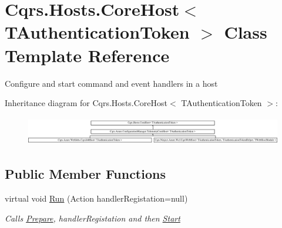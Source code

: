 \hypertarget{classCqrs_1_1Hosts_1_1CoreHost}{}\section{Cqrs.\+Hosts.\+Core\+Host$<$ T\+Authentication\+Token $>$ Class Template Reference}
\label{classCqrs_1_1Hosts_1_1CoreHost}


Configure and start command and event handlers in a host  


Inheritance diagram for Cqrs.\+Hosts.\+Core\+Host$<$ T\+Authentication\+Token $>$\+:\begin{figure}[H]
\begin{center}
\leavevmode
\includegraphics[height=1.284404cm]{classCqrs_1_1Hosts_1_1CoreHost}
\end{center}
\end{figure}
\subsection*{Public Member Functions}
\begin{DoxyCompactItemize}
\item 
virtual void \hyperlink{classCqrs_1_1Hosts_1_1CoreHost_a118553f5aa11e7fe07fce1d899528fa6_a118553f5aa11e7fe07fce1d899528fa6}{Run} (Action handler\+Registation=null)
\begin{DoxyCompactList}\small\item\em Calls \hyperlink{classCqrs_1_1Hosts_1_1CoreHost_aa01932c1199967babe19c3059e86f513_aa01932c1199967babe19c3059e86f513}{Prepare}, {\itshape handler\+Registation}  and then \hyperlink{classCqrs_1_1Hosts_1_1CoreHost_ad8abd7b3c7f6970e106ba42c2745beda_ad8abd7b3c7f6970e106ba42c2745beda}{Start} \end{DoxyCompactList}\end{DoxyCompactItemize}
